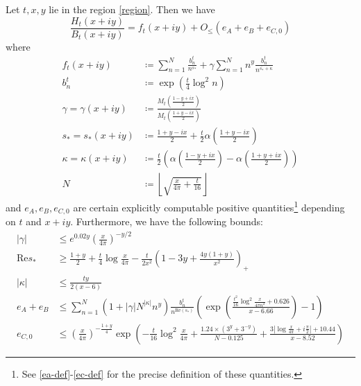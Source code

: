 \begin{theorem}\label{eff}  Let $t,x,y$ lie in the region \eqref{region}.  Then we have
\begin{equation}\label{ratio-form-eff}
\frac{H_t(x+iy)}{B_t(x+iy)} = f_t(x+iy) + O_{\leq}\left( e_A + e_B + e_{C,0} \right)
\end{equation}
where
\begin{align}
f_t(x+iy) &\coloneqq \sum_{n=1}^N \frac{b_n^t}{n^{s_*}} + \gamma \sum_{n=1}^N n^y \frac{b_n^t}{n^{\overline{s_*} + \kappa}}\label{ft-def} \\
b_n^t &\coloneqq \exp( \frac{t}{4} \log^2 n ) \label{bn-def}\\
\gamma = \gamma(x+iy) &\coloneqq \frac{M_t\left(\frac{1-y+ix}{2}\right)}{M_t\left(\frac{1+y-ix}{2}\right)} \label{lambda-def} \\
s_* = s_*(x+iy) &\coloneqq \frac{1+y-ix}{2} +\frac{t}{2} \alpha\left(\frac{1+y-ix}{2}\right) \label{sn-def}\\
\kappa = \kappa(x+iy) &\coloneqq \frac{t}{2} \left(\alpha\left(\frac{1-y+ix}{2}\right) - \alpha\left(\frac{1+y+ix}{2}\right)\right) \label{kappa-def}\\
N &\coloneqq \left\lfloor \sqrt{\frac{x}{4\pi} + \frac{t}{16}} \right\rfloor \label{N-def-main} 
\end{align}
and $e_A, e_B, e_{C,0}$ are certain explicitly computable positive quantities\footnote{See \eqref{ea-def}-\eqref{ec-def} for the precise definition of these quantities.} depending on $t$ and $x+iy$.  Furthermore, we have the following bounds:
\begin{align}
|\gamma| &\leq e^{0.02 y} \left( \frac{x}{4\pi} \right)^{-y/2}  \label{gamma-bound} \\
\mathrm{Re} s_* &\geq \frac{1+y}{2} +\frac{t}{4} \log \frac{x}{4\pi} - \frac{t}{2x^2} (1-3y+\frac{4y(1+y)}{x^2})_+  \label{res-bound} \\
|\kappa| &\leq  \frac{ty}{2(x-6)} \label{kappa-bound} \\
e_A + e_B &\leq \sum_{n=1}^N (1 + |\gamma| N^{|\kappa|} n^y) \frac{b_n^t}{n^{\mathrm{Re}(s_*)}} \left( \exp\left( \frac{\frac{t^2}{16} \log^2 \frac{x}{4\pi n^2} + 0.626}{x-6.66} \right)-1 \right) \label{eab-bound} \\
e_{C,0} &\leq \left(\frac{x}{4\pi}\right)^{-\frac{1+y}{4}} \exp\left( - \frac{t}{16} \log^2 \frac{x}{4\pi} + \frac{1.24 \times (3^y+3^{-y})}{N-0.125} + \frac{3 |\log \frac{x}{4\pi} + i \frac{\pi}{2}|+10.44}{x-8.52} \right) \label{ec-bound}
\end{align}
\end{theorem}

